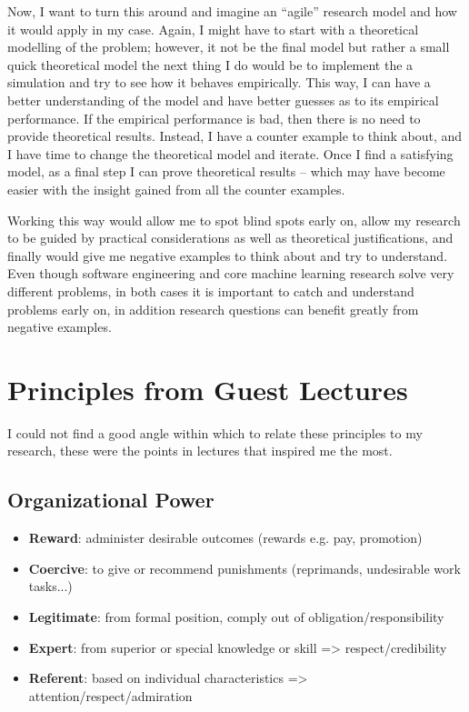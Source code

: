 \documentclass[pra, onecolumn,superscriptaddress,nofootinbib]{revtex4}
\begin{document}
    Now, I want to turn this around and imagine an ``agile'' research model and how it would apply in my case. Again, I might have to start with a theoretical  modelling of the problem; however, it not be the final model but rather a small quick theoretical model the next thing I do would be to implement the a simulation and try to see how it behaves empirically. This way, I can have a better understanding of the model and have better guesses as to its empirical performance. If the empirical performance is bad, then there is no need to provide theoretical results. Instead, I have a counter example to think about, and I have time to change the theoretical model and iterate. Once I find a satisfying model, as a final step I can prove theoretical results -- which may have become easier with the insight gained from all the counter examples. 

    Working this way would allow me to spot blind spots early on, allow my research to be guided by practical considerations as well as theoretical justifications, and finally would give me negative examples to think about and try to understand. Even though software engineering and core machine learning research solve very different problems, in both cases it is important to catch and understand problems early on, in addition research questions can benefit greatly from negative examples.



\section{Principles from Guest Lectures}
I could not find a good angle within which to relate these principles to my research, these were the points in lectures that inspired me the most.


\subsection{Organizational Power}

\begin{itemize}
    \item \textbf{Reward}: administer desirable outcomes (rewards e.g. pay, promotion)
    \item \textbf{Coercive}: to give or recommend punishments (reprimands, undesirable work tasks...)
    \item \textbf{Legitimate}: from formal position, comply out of obligation/responsibility
    \item \textbf{Expert}: from superior or special knowledge or skill => respect/credibility
    \item \textbf{Referent}: based on individual characteristics => attention/respect/admiration
\end{itemize}
\end{document}
